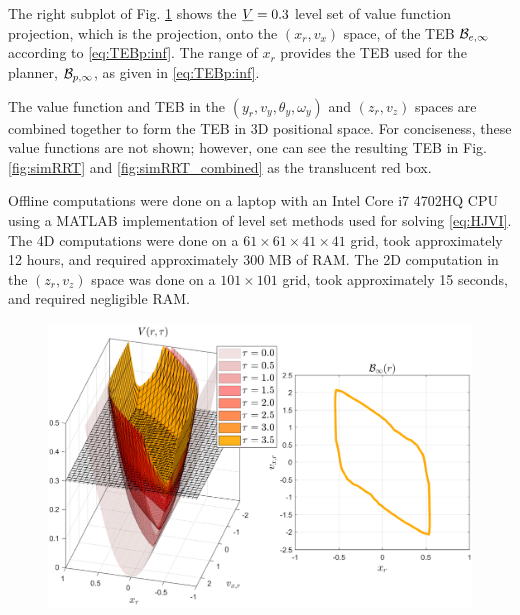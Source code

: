The right subplot of Fig. \ref{fig:valfuncRRT} shows the $\underline{V} = 0.3$ level set of value function projection, which is the projection, onto the $(x_r, v_x)$ space, of the TEB $\mathcal B_{e, \infty}$ according to \eqref{eq:TEBp:inf}.
The range of $x_r$ provides the TEB used for the planner, $\mathcal B_{p, \infty}$, as given in \eqref{eq:TEBp:inf}.

The value function and TEB in the $(y_r, v_y, \theta_y, \omega_y)$ and $(z_r, v_z)$ spaces are combined together to form the TEB in 3D positional space.
For conciseness, these value functions are not shown; however, one can see the resulting TEB in Fig. \ref{fig:simRRT} and \ref{fig:simRRT_combined} as the translucent red box.

Offline computations were done on a laptop with an Intel Core i7 4702HQ CPU using a MATLAB implementation of level set methods \cite{Mitchell07c} used for solving \eqref{eq:HJVI}.
The 4D computations were done on a $61\times 61 \times 41 \times 41$ grid, took approximately 12 hours, and required approximately 300 MB of RAM.
The 2D computation in the $(z_r, v_z)$ space was done on a $101 \times 101$ grid, took approximately 15 seconds, and required negligible RAM.

\begin{figure}
  \includegraphics[width=\columnwidth]{fig/Q10D_Q3D/valfunc}
  \caption{}
  \label{fig:valfuncRRT}
\end{figure}

